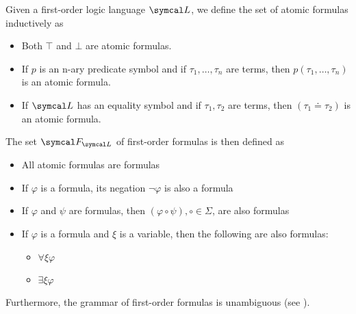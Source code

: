 \begin{definition}\label{def:first_order_formula}\cite[189]{OpenLogic20201202}
  Given a first-order logic language \( \Cal{L} \), we define the set of atomic formulas inductively as
  \begin{itemize}
    \item Both \( \top \) and \( \bot \) are atomic formulas.
    \item If \( p \) is an n-ary predicate symbol and if \( \tau_1, \ldots, \tau_n \) are terms, then \( p(\tau_1, \ldots, \tau_n) \) is an atomic formula.
    \item If \( \Cal{L} \) has an equality symbol and if \( \tau_1, \tau_2 \) are terms, then \( (\tau_1 \doteq \tau_2) \) is an atomic formula.
  \end{itemize}

  The set \( \Cal{F}_{\Cal{L}} \) of first-order formulas is then defined as
  \begin{itemize}
    \item All atomic formulas are formulas
    \item If \( \varphi \) is a formula, its negation \( \neg \varphi \) is also a formula
    \item If \( \varphi \) and \( \psi \) are formulas, then \( (\varphi \circ \psi), \circ \in \Sigma \), are also formulas
    \item If \( \varphi \) is a formula and \( \xi \) is a variable, then the following are also formulas:
    \begin{itemize}
      \item \( \forall \xi \varphi \)
      \item \( \exists \xi \varphi \)
    \end{itemize}
  \end{itemize}

  Furthermore, the grammar of first-order formulas is unambiguous (see ).


\end{definition}
